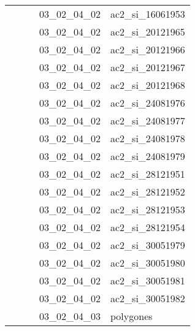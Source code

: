 \documentclass[12pt,titlepage,oneside]{book}
\begin{document}
\begin{supertabular}{|p{7.5cm}|p{7.5cm}|p{7.5cm}|c|p{10cm}|}
                   &                    &                    & 03\_02\_04\_02 & ac2\_si\_16061953\\
                   &                    &                    & 03\_02\_04\_02 & ac2\_si\_20121965\\
                   &                    &                    & 03\_02\_04\_02 & ac2\_si\_20121966\\
                   &                    &                    & 03\_02\_04\_02 & ac2\_si\_20121967\\
                   &                    &                    & 03\_02\_04\_02 & ac2\_si\_20121968\\
                   &                    &                    & 03\_02\_04\_02 & ac2\_si\_24081976\\
                   &                    &                    & 03\_02\_04\_02 & ac2\_si\_24081977\\
                   &                    &                    & 03\_02\_04\_02 & ac2\_si\_24081978\\
                   &                    &                    & 03\_02\_04\_02 & ac2\_si\_24081979\\
                   &                    &                    & 03\_02\_04\_02 & ac2\_si\_28121951\\
                   &                    &                    & 03\_02\_04\_02 & ac2\_si\_28121952\\
                   &                    &                    & 03\_02\_04\_02 & ac2\_si\_28121953\\
                   &                    &                    & 03\_02\_04\_02 & ac2\_si\_28121954\\
                   &                    &                    & 03\_02\_04\_02 & ac2\_si\_30051979\\
                   &                    &                    & 03\_02\_04\_02 & ac2\_si\_30051980\\
                   &                    &                    & 03\_02\_04\_02 & ac2\_si\_30051981\\
                   &                    &                    & 03\_02\_04\_02 & ac2\_si\_30051982\\
                   &                    &                    & 03\_02\_04\_03 & polygones\\

\end{supertabular}
\end{document}

